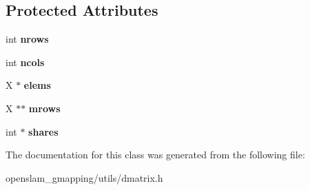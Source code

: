 \subsection*{Protected Attributes}
\begin{DoxyCompactItemize}
\item 
\mbox{\label{classGMapping_1_1DMatrix_a2d5494e0c457100420da5ecc05b4a81c}} 
int {\bfseries nrows}
\item 
\mbox{\label{classGMapping_1_1DMatrix_af18b00391a81dc023fee41d09ab95d03}} 
int {\bfseries ncols}
\item 
\mbox{\label{classGMapping_1_1DMatrix_a4e4653eda4139f2c5d64b46a872ac70f}} 
X $\ast$ {\bfseries elems}
\item 
\mbox{\label{classGMapping_1_1DMatrix_a9f2626f3fb20057f1ea7baa845ca4c4d}} 
X $\ast$$\ast$ {\bfseries mrows}
\item 
\mbox{\label{classGMapping_1_1DMatrix_a9f05db4d73ea6b2011bd95da98feb809}} 
int $\ast$ {\bfseries shares}
\end{DoxyCompactItemize}


The documentation for this class was generated from the following file\+:\begin{DoxyCompactItemize}
\item 
openslam\+\_\+gmapping/utils/dmatrix.\+h\end{DoxyCompactItemize}
